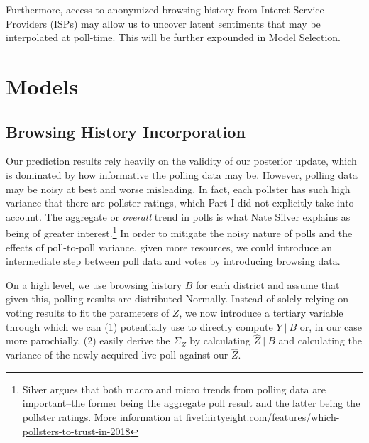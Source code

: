 \documentclass[12pt]{article}
\begin{document}
Furthermore, access to anonymized browsing history from Interet Service Providers (ISPs) may allow us to uncover latent sentiments that may be interpolated at poll-time. This will be further expounded in Model Selection. 

\section{Models}
\subsection{Browsing History Incorporation}
Our prediction results rely heavily on the validity of our posterior update, which is dominated by how informative the polling data may be. However, polling data may be noisy at best and worse misleading. In fact, each pollster has such high variance that there are pollster ratings, which Part I did not explicitly take into account. The aggregate or \textit{overall} trend in polls is what Nate Silver explains as being of greater interest.\footnote{Silver argues that both macro and micro trends from polling data are important--the former being the aggregate poll result and the latter being the pollster ratings. More information at \url{fivethirtyeight.com/features/which-pollsters-to-trust-in-2018}} In order to mitigate the noisy nature of polls and the effects of poll-to-poll variance, given more resources, we could introduce an intermediate step between poll data and votes by introducing browsing data.

On a high level, we use browsing history $B$ for each district and assume that given this, polling results are distributed Normally. Instead of solely relying on voting results to fit the parameters of $Z$, we now introduce a tertiary variable through which we can (1) potentially use to directly compute $Y \ | \ B$ or, in our case more parochially, (2) easily derive the $\Sigma_Z$ by calculating $\hat{Z} \ | \ B$ and calculating the variance of the newly acquired live poll against our $\hat{Z}$.
\end{document}
